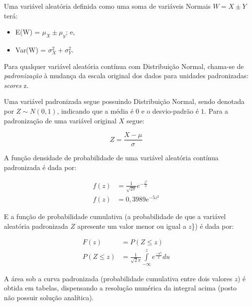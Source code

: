 \documentclass[
]{book}
\providecommand{\tightlist}{%
  \setlength{\itemsep}{0pt}\setlength{\parskip}{0pt}}
\begin{document}
\hfill\break

Uma variável aleatória definida como uma soma de variáveis Normais \(W=X \pm Y\) terá:

\hfill\break

\begin{itemize}
\tightlist
\item
  E(W) = \(\mu_{X} \pm \mu_{y}\); e,\\
\item
  Var(W) = \(\sigma^{2}_{X} + \sigma^{2}_{Y}\).
\end{itemize}

\hfill\break

Para qualquer variável aleatória contínua com Distribuição Normal, chama-se de \emph{padronização} à mudança da escala original dos dados para unidades padronizadas: \emph{scores} z.

\hfill\break

Uma variável padronizada segue possuindo Distribuição Normal, sendo denotada por \(Z \sim N (0,1)\), indicando que a média é \(0\) e o desvio-padrão é \(1\). Para a padronização de uma variável original \(X\) segue:

\hfill\break

\[
Z = \frac{X-\mu}{\sigma}
\]

\hfill\break

A função densidade de probabilidade de uma variável aleatória contínua padronizada é dada por:

\hfill\break

\begin{align*}
f(z) & = \frac{1}{{\sqrt {2\pi } }}e^{ - \frac{{z^2 }}{2}} \\
f(z) & = 0,3989e^{ - 5z^2}    
\end{align*}

\hfill\break

E a função de probabilidade cumulativa (a probabilidade de que a variável aleatória padronizada \(Z\) apresente um valor menor ou igual a \(z\)\}) é dada por:

\hfill\break

\begin{align*}
F(z) &  = P(Z\le z) \\
P(Z\le z) &  =  \frac{1}{\sqrt{2}\pi } \underset{-\infty }{\overset{z}{\int }} e^\frac{-u^{2}}  {2}   du     
\end{align*}

\hfill\break

A área sob a curva padronizada (probabilidade cumulativa entre dois valores \(z\)) é obtida em tabelas, dispensando a resolução numérica da integral acima (posto não possuir solução analítica).
\end{document}
